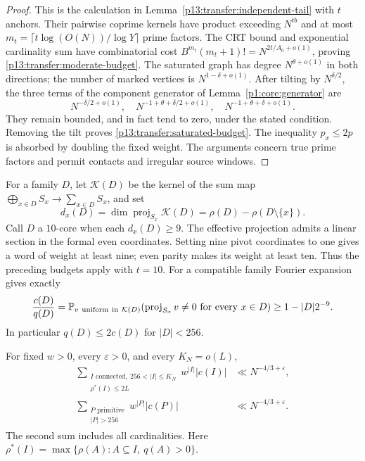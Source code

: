 \begin{proof}
This is the calculation in Lemma~\ref{p13:transfer:independent-tail}
with $t$ anchors. Their pairwise coprime kernels have product exceeding
$N^{tb}$ and at most
$m_t=\lceil t\log(O(N))/\log Y\rceil$ prime factors.
The CRT bound and exponential cardinality sum have combinatorial cost
$B^{m_t}(m_t+1)!=N^{2t/A_0+o(1)}$, proving
\eqref{p13:transfer:moderate-budget}.
The saturated graph has degree $N^{\theta+o(1)}$ in both directions;
the number of marked vertices is $N^{1-\delta+o(1)}$.
After tilting by $N^{\delta/2}$, the three terms of the component
generator of Lemma~\ref{p1:core:generator} are
\[
 N^{-\delta/2+o(1)},\quad
 N^{-1+\theta+\delta/2+o(1)},\quad
 N^{-1+\theta+\delta+o(1)}.
\]
They remain bounded, and in fact tend to zero, under the stated
condition. Removing the tilt proves
\eqref{p13:transfer:saturated-budget}. The inequality $p_x\leq2p$
is absorbed by doubling the fixed weight. The arguments concern true
prime factors and permit contacts and irregular source windows.
\end{proof}

For a family $D$, let $\mathcal K(D)$ be the kernel of the sum map
$\bigoplus_{x\in D}S_x\to\sum_{x\in D}S_x$, and set
\[
 d_x(D)=\dim\operatorname{proj}_{S_x}\mathcal K(D)
       =\rho(D)-\rho(D\setminus\{x\}).
\]
Call $D$ a $10$-core when each $d_x(D)\geq9$.
The effective projection admits a linear section in the formal even
coordinates. Setting nine pivot coordinates to one gives a word of
weight at least nine; even parity makes its weight at least ten.
Thus the preceding budgets apply with $t=10$.
For a compatible family Fourier expansion gives exactly
\begin{equation}
 \frac{c(D)}{q(D)}
 =\P_{v\ \mathrm{uniform\ in}\ \mathcal K(D)}
       (\operatorname{proj}_{S_x}v\ne0\text{ for every }x\in D)
 \geq1-|D|2^{-9}.
 \label{p13:transfer:core-ratio}
\end{equation}
In particular $q(D)\leq2c(D)$ for $|D|<256$.

\begin{proposition}
\label{p13:transfer:uniform-tail}
For fixed $w>0$, every $\varepsilon>0$, and every $K_N=o(L)$,
\begin{align}
 \sum_{\substack{I\text{ connected},\ 256<|I|\leq K_N\\
                         \rho^*(I)\leq2L}}
              w^{|I|}|c(I)|&\ll N^{-4/3+\varepsilon},
                    \label{p13:transfer:connected-tail}\\
 \sum_{\substack{P\text{ primitive}\\|P|>256}}
              w^{|P|}|c(P)|&\ll N^{-4/3+\varepsilon}.
                    \label{p13:transfer:primitive-tail}
\end{align}
The second sum includes all cardinalities. Here
$\rho^*(I)=\max\{\rho(A):A\subseteq I,\ q(A)>0\}$.
\end{proposition}

